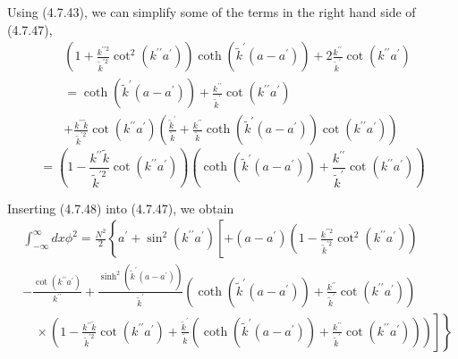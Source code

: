 \documentclass{article}
\begin{document}
Using (4.7.43), we can simplify some of the terms in the right hand side of (4.7.47),
$$
\begin{align*}
&\left(1+\frac{k^{\prime \prime 2}}{\tilde{k}^{\prime 2}} \cot ^{2}\left(k^{\prime \prime} a^{\prime}\right)\right) \operatorname{coth}\left(\tilde{k}^{\prime}\left(a-a^{\prime}\right)\right)+2 \frac{k^{\prime \prime}}{\tilde{k}^{\prime}} \cot \left(k^{\prime \prime} a^{\prime}\right)  \tag{4.7.48}\\
&=\operatorname{coth}\left(\tilde{k}^{\prime}\left(a-a^{\prime}\right)\right)+\frac{k^{\prime \prime}}{\tilde{k}^{\prime}} \cot \left(k^{\prime \prime} a^{\prime}\right) \\
&+\frac{k^{\prime \prime} \tilde{k}}{\tilde{k}^{\prime 2}} \cot \left(k^{\prime \prime} a^{\prime}\right)\left(\frac{\tilde{k}^{\prime}}{\tilde{k}}+\frac{k^{\prime \prime}}{\tilde{k}} \operatorname{coth}\left(\tilde{k}^{\prime}\left(a-a^{\prime}\right)\right) \cot \left(k^{\prime \prime} a^{\prime}\right)\right)
\end{align*}
$$
$$
=\left(1-\frac{k^{\prime \prime} \tilde{k}}{\tilde{k}^{\prime 2}} \cot \left(k^{\prime \prime} a^{\prime}\right)\right)\left(\operatorname{coth}\left(\tilde{k}^{\prime}\left(a-a^{\prime}\right)\right)+\frac{k^{\prime \prime}}{\tilde{k}^{\prime}} \cot \left(k^{\prime \prime} a^{\prime}\right)\right)
$$

Inserting (4.7.48) into (4.7.47), we obtain
$$
\begin{align*}
& \int_{-\infty}^{\infty} d x \phi^{2}=\frac{N^{2}}{2}\left\{a^{\prime}+\sin ^{2}\left(k^{\prime \prime} a^{\prime}\right)\left[+\left(a-a^{\prime}\right)\left(1-\frac{k^{\prime \prime 2}}{\tilde{k}^{\prime 2}} \cot ^{2}\left(k^{\prime \prime} a^{\prime}\right)\right)\right.\right.  \tag{4.7.49}\\
& -\frac{\cot \left(k^{\prime \prime} a^{\prime}\right)}{k^{\prime \prime}}+\frac{\sinh ^{2}\left(\tilde{k}^{\prime}\left(a-a^{\prime}\right)\right)}{\tilde{k}^{\prime}}\left(\operatorname{coth}\left(\tilde{k}^{\prime}\left(a-a^{\prime}\right)\right)+\frac{k^{\prime \prime}}{\tilde{k}^{\prime}} \cot \left(k^{\prime \prime} a^{\prime}\right)\right) \\
& \left.\left.\quad \times\left(1-\frac{k^{\prime \prime} \tilde{k}}{\tilde{k}^{\prime 2}} \cot \left(k^{\prime \prime} a^{\prime}\right)+\frac{\tilde{k}^{\prime}}{\tilde{k}}\left(\operatorname{coth}\left(\tilde{k}^{\prime}\left(a-a^{\prime}\right)\right)+\frac{k^{\prime \prime}}{\tilde{k}^{\prime}} \cot \left(k^{\prime \prime} a^{\prime}\right)\right)\right)\right]\right\}
\end{align*}
$$
\end{document}
